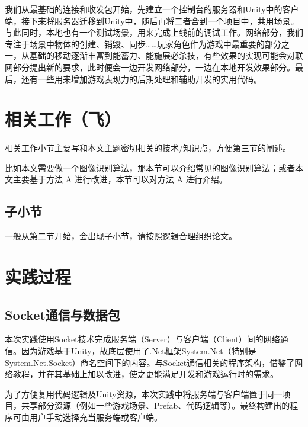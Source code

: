 \documentclass[conference]{IEEEtran}
\begin{document}
我们从最基础的连接和收发包开始，先建立一个控制台的服务器和Unity中的客户端，接下来将服务器迁移到Unity中，随后再将二者合到一个项目中，共用场景。与此同时，本地也有一个测试场景，用来完成上线前的调试工作。网络部分，我们专注于场景中物体的创建、销毁、同步……玩家角色作为游戏中最重要的部分之一，从基础的移动逐渐丰富到能蓄力、能施展必杀技，有些效果的实现可能会对联网部分提出新的要求，此时便会一边开发网络部分，一边在本地开发效果部分。最后，还有一些用来增加游戏表现力的后期处理和辅助开发的实用代码。


\section{相关工作（飞）}
相关工作小节主要写和本文主题密切相关的技术/知识点，方便第三节的阐述。

比如本文需要做一个图像识别算法，那本节可以介绍常见的图像识别算法；或者本文主要基于方法 A 进行改进，本节可以对方法 A 进行介绍。

\subsection{子小节}

一般从第二节开始，会出现子小节，请按照逻辑合理组织论文。

\section{实践过程}

\subsection{Socket通信与数据包}
本次实践使用Socket技术完成服务端（Server）与客户端（Client）间的网络通信。因为游戏基于Unity，故底层使用了.Net框架System.Net（特别是System.Net.Socket）命名空间下的内容。与Socket通信相关的程序架构，借鉴了网络教程\cite{myCite:Tom}，并在其基础上加以改进，使之更能满足开发和游戏运行时的需求。

为了方便复用代码逻辑及Unity资源，本次实践中将服务端与客户端置于同一项目，共享部分资源（例如一些游戏场景、Prefab、代码逻辑等）。最终构建出的程序可由用户手动选择充当服务端或客户端。
\end{document}
